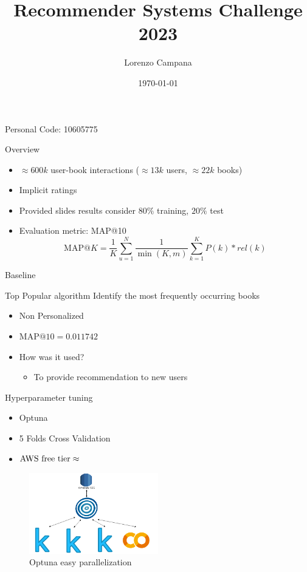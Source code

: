 \documentclass{beamer}
\title{Recommender Systems Challenge 2023}
\author{Lorenzo Campana}
\institute{Politecnico di Milano}
\date{\today}
\begin{document}
\begin{frame}
  \titlepage\center Personal Code: 10605775
\end{frame}

\begin{frame}{Overview}
  \begin{itemize}
    \item $\approx 600k$ user-book interactions ($\approx 13k$ users, $\approx 22k$ books)
    \item Implicit ratings
    \item Provided slides results consider $80\%$ training, $20\%$ test
    \item Evaluation metric: MAP@10 
      \[
      \text{MAP@}K = \frac{1}{K} \sum_{u=1}^{N} \frac{1}{\min(K, m)} \sum_{k=1}^{K} P(k) * rel(k)
      \]
  \end{itemize}
\end{frame}

\begin{frame}{Baseline}
  \begin{block}{Top Popular algorithm}
    Identify the most frequently occurring books
  \end{block}
  \begin{itemize}
    \item Non Personalized
    \item $\text{MAP@}10=0.011742$
    \item How was it used?
    \begin{itemize}
      \item To provide recommendation to new users
    \end{itemize}
  \end{itemize}
\end{frame}

\begin{frame}{Hyperparameter tuning}
  \begin{itemize}
    \item Optuna
    \item 5 Folds Cross Validation
    \item $\text{\text{AWS free tier}} \approx $ 
  \end{itemize}
  \begin{figure}
    \vspace{1cm}
    \centering
    \includegraphics[width=0.5\textwidth]{diagram_aws_optuna_1.png}
    \caption{Optuna easy parallelization}
  \end{figure}
  
\end{frame}
\end{document}
